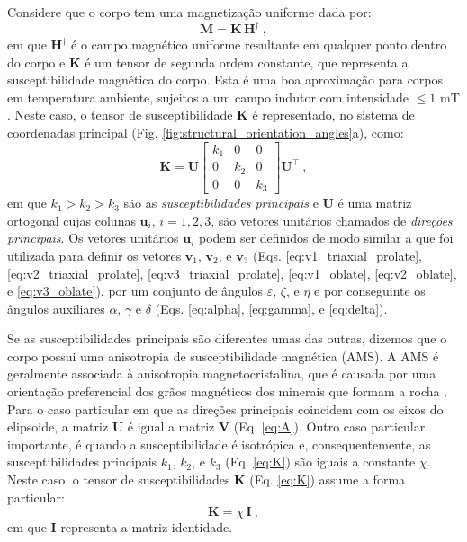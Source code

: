 Considere que o corpo tem uma magnetização uniforme dada por:
\begin{equation}
\mathbf{M} = \mathbf{K} \, \mathbf{H}^{\dagger} \: ,
\label{eq:M-KH}
\end{equation}
em que $\mathbf{H}^{\dagger}$ é o campo magnético uniforme resultante em qualquer ponto dentro do corpo e $\mathbf{K}$ é um tensor de segunda ordem constante, que representa a susceptibilidade magnética do corpo. Esta é uma boa aproximação para corpos em temperatura ambiente, sujeitos a um campo indutor com intensidade $\leq 1$ \unit{mT} \citep{rochette1992}. Neste caso, o tensor de susceptibilidade $\mathbf{K}$ é representado, no sistema de coordenadas principal (Fig. \ref{fig:structural_orientation_angles}a), como:
\begin{equation}
\mathbf{K} = \mathbf{U}
\left[ \begin{array}{ccc}
k_{1} & 0 & 0 \\
0 & k_{2} & 0 \\
0 & 0 & k_{3} 
\end{array} \right] \mathbf{U}^{\top} \: ,
\label{eq:K}
\end{equation}
em que $k_{1} > k_{2} > k_{3}$ são as 
\textit{susceptibilidades principais} e $\mathbf{U}$ é
uma matriz ortogonal cujas colunas $\mathbf{u}_{i}$,
$i = 1, 2, 3$, são vetores unitários chamados de 
\textit{direções principais}.
Os vetores unitários $\mathbf{u}_{i}$ podem ser definidos de modo similar a que foi utilizada para definir os vetores
$\mathbf{v}_{1}$, $\mathbf{v}_{2}$,
e $\mathbf{v}_{3}$ (Eqs. \ref{eq:v1_triaxial_prolate},
\ref{eq:v2_triaxial_prolate}, \ref{eq:v3_triaxial_prolate},
\ref{eq:v1_oblate}, \ref{eq:v2_oblate}, e \ref{eq:v3_oblate}),
por um conjunto de ângulos $\varepsilon$, $\zeta$,
e $\eta$ e por conseguinte os ângulos auxiliares $\alpha$, $\gamma$ e $\delta$ (Eqs. \ref{eq:alpha}, \ref{eq:gamma}, e
\ref{eq:delta}).

Se as susceptibilidades principais são diferentes umas das outras, dizemos que o corpo possui uma anisotropia de susceptibilidade magnética (AMS). A AMS é geralmente associada à anisotropia magnetocristalina, que é causada por uma orientação preferencial dos grãos magnéticos dos minerais que formam a rocha \citep{fuller1963, uyeda1963, janak1972, hrouda1982, thompson1986, macdonald1987, rochette1992, dunlop1997, tauxe2003rudiments}. Para o caso particular em que as direções principais coincidem com os eixos do elipsoide, a matriz $\mathbf{U}$ é igual a matriz $\mathbf{V}$ (Eq. \ref{eq:A}). Outro caso particular importante, é quando a susceptibilidade é isotrópica e, consequentemente, as susceptibilidades principais $k_{1}$, $k_{2}$, e $k_{3}$ (Eq. \ref{eq:K}) são iguais a constante $\chi$. Neste caso, o tensor de susceptibilidades $\mathbf{K}$ (Eq. \ref{eq:K}) assume a forma particular:
\begin{equation}
\mathbf{K} = \chi \, \mathbf{I} \: ,
\label{eq:K-isotropic}
\end{equation}
em que $\mathbf{I}$ representa a matriz identidade.

